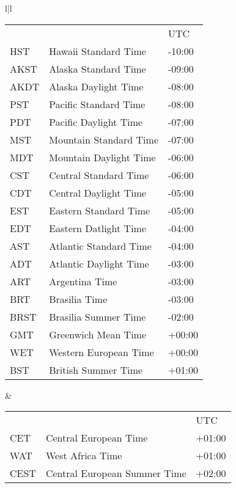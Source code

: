\documentclass[12pt]{article}
\newlength{\figurewidth}
\newenvironment{boxedfigure}[1][!btp]%
	{\begin{figure*}[#1]
	 \begin{lrbox}{\figurebox}
	 \begin{minipage}{\figurewidth}

	 \vspace*{1ex}}%
	{
	 \vspace*{1ex}

	 \end{minipage}
	 \end{lrbox}
	 \begin{center}
	 \fbox{\hspace*{0.1in}\usebox{\figurebox}\hspace*{0.1in}}
	 \end{center}
	 \end{figure*}}
\begin{document}
\begin{boxedfigure}[t]

\footnotesize

\begin{center}
\begin{tabular}{l|l}
\begin{tabular}[t]{@{}lll@{}}
      &                               & UTC \\
HST   & Hawaii Standard Time          & -10:00 \\
AKST  & Alaska Standard Time          & -09:00 \\
AKDT  & Alaska Daylight Time          & -08:00 \\
PST   & Pacific Standard Time         & -08:00 \\
PDT   & Pacific Daylight Time         & -07:00 \\
MST   & Mountain Standard Time        & -07:00 \\
MDT   & Mountain Daylight Time        & -06:00 \\
CST   & Central Standard Time         & -06:00 \\
CDT   & Central Daylight Time         & -05:00 \\
EST   & Eastern Standard Time         & -05:00 \\
EDT   & Eastern Datlight Time         & -04:00 \\
AST   & Atlantic Standard Time        & -04:00 \\
ADT   & Atlantic Daylight Time        & -03:00 \\
ART   & Argentina Time                & -03:00 \\
BRT   & Brasilia Time                 & -03:00 \\
BRST  & Brasilia Summer Time          & -02:00 \\
GMT   & Greenwich Mean Time           & +00:00 \\
WET   & Western European Time         & +00:00 \\
BST   & British Summer Time           & +01:00 \\
\end{tabular}
&
\begin{tabular}[t]{@{}lll@{}}
      &                               & UTC \\
CET   & Central European Time         & +01:00 \\
WAT   & West Africa Time              & +01:00 \\
CEST  & Central European Summer Time  & +02:00 \\

\end{tabular}
\end{tabular}
\end{center}
\end{boxedfigure}
\end{document}
